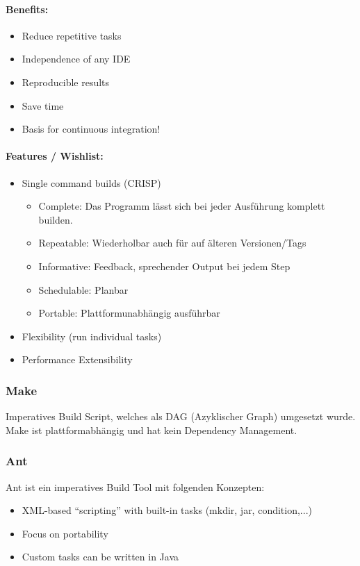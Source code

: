 \paragraph{Benefits:}
\begin{itemize}
	\item Reduce repetitive tasks
	\item Independence of any IDE
	\item Reproducible results
	\item Save time
	\item Basis for continuous integration!
\end{itemize}

\paragraph{Features / Wishlist:}
\begin{itemize}
	\item Single command builds (CRISP)
		\begin{itemize}
			\item Complete: Das Programm lässt sich bei jeder Ausführung komplett builden. 
			\item Repeatable: Wiederholbar auch für auf älteren Versionen/Tags
			\item Informative: Feedback, sprechender Output bei jedem Step 
			\item Schedulable: Planbar
			\item Portable: Plattformunabhängig ausführbar
		\end{itemize}
	\item Flexibility (run individual tasks)
	\item Performance Extensibility
\end{itemize}

\subsubsection{Make}

Imperatives Build Script, welches als DAG (Azyklischer Graph) umgesetzt wurde. Make ist plattformabhängig und hat kein Dependency Management.


\subsubsection{Ant}

Ant ist ein imperatives Build Tool mit folgenden Konzepten:
\begin{itemize}
	\item XML-based “scripting” with built-in tasks (mkdir, jar, condition,...)
	\item Focus on portability
	\item Custom tasks can be written in Java
\end{itemize}

